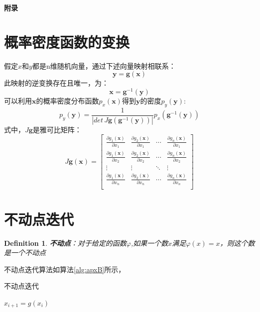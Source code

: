 \documentclass[UTF8,zihao=5,a4paper]{ctexart}
\newtheorem{Def}{Definition}
\begin{document}
\newpage
{\noindent\LARGE{\textbf{附录}}}
\begin{appendix}
\section{概率密度函数的变换}\label{apx:1}
假定$x$和$y$都是n维随机向量，通过下述向量映射相联系：
\[
    \mathbf{y}=\mathbf{g}(\mathbf{x})
\]
此映射的逆变换存在且唯一，为：
\[
    \mathbf{x}=\mathbf{g}^{-1}(\mathbf{y})
\]
可以利用$\mathbf{x}$的概率密度分布函数$p_x(\mathbf{x})$得到$\mathbf{y}$的密度$p_y(\mathbf{y})$:
\[
    p_y(\mathbf{y})=
    \frac{1}{| det\,\mathit{J}\mathbf{g}(\mathbf{g}^{-1}(\mathbf{y}) ) |}
    p_x(\mathbf{g}^{-1}(\mathbf{y}))
\]
式中，$\mathit{J}\mathbf{g}$是雅可比矩阵：
\[
    \mathit{J}\mathbf{g}(\mathbf{x})=\left[
    \begin{array}{cccc}
    \frac{\partial g_1(\mathbf{x})}{\partial x_1}&  \frac{\partial g_2(\mathbf{x})}{\partial x_1}&  \cdots&  \frac{\partial g_n(\mathbf{x})}{\partial x_1}\\ 
    \frac{\partial g_1(\mathbf{x})}{\partial x_2}&  \frac{\partial g_2(\mathbf{x})}{\partial x_2}&  \cdots&  \frac{\partial g_n(\mathbf{x})}{\partial x_2}\\ 
    \vdots&  \vdots&  \ddots&  \vdots\\ 
    \frac{\partial g_1(\mathbf{x})}{\partial x_n}&  \frac{\partial g_2(\mathbf{x})}{\partial x_n}&  \cdots&  \frac{\partial g_n(\mathbf{x})}{\partial x_n}\\ 
    \end{array} 
    \right]
\]

\section{不动点迭代}\label{apx:2}
\begin{Def}
    \textbf{不动点}：对于给定的函数$\varphi$,如果一个数$x$满足$\varphi(x)=x$，则这个数是一个不动点
\end{Def}

不动点迭代算法如算法\ref{alg:apxB}所示，
\begin{algorithm}
    \caption{不动点迭代}  
    \label{alg:apxB}
    \begin{algorithmic}  
        \REPEAT
        \STATE $x_{i+1}=g(x_i)$
    \end{algorithmic}  
\end{algorithm}


\end{appendix}
\end{document}
